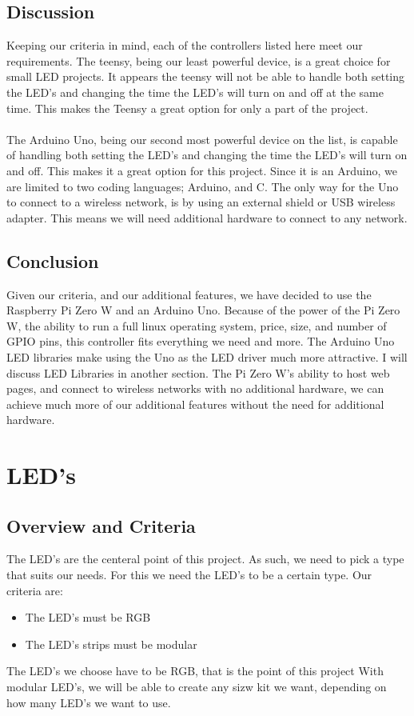 \documentclass[onecolumn, draftclsnofoot,10pt, compsoc]{IEEEtran}
\begin{document}
		\subsection{Discussion}
		Keeping our criteria in mind, each of the controllers listed here meet our
		requirements. The teensy, being our least powerful device, is a great choice
		for small LED projects. It appears the teensy will not be able to handle
		both setting the LED's and changing the time the LED's will turn on and off
		at the same time. This makes the Teensy a great option for only a part of
		the project.
		\\\\
		The Arduino Uno, being our second most powerful device on the list, is
		capable of handling both setting the LED's and changing the time the LED's
		will turn on and off. This makes it a great option for this project. Since
		it is an Arduino, we are limited to two coding languages; Arduino, and C.
		The only way for the Uno to connect to a wireless network, is by using an
		external shield or USB wireless adapter. This means we will need additional
		hardware to connect to any network.
		\subsection{Conclusion}
		Given our criteria, and our additional features, we have decided to use the
		Raspberry Pi Zero W and an Arduino Uno. Because of the power of the Pi Zero
		W, the ability to run a full linux operating system, price, size, and number
		of GPIO pins, this controller fits everything we need and more. The Arduino
		Uno LED libraries make using the Uno as the LED driver much more attractive.
		I will discuss LED Libraries in another section. The Pi Zero W's ability to
		host web pages, and connect to wireless networks with no additional
		hardware, we can achieve much more of our additional features without the
		need for additional hardware.
	\section{LED's}
		\subsection{Overview and Criteria}
		The LED's are the centeral point of this project. As such, we need to pick
		a type that suits our needs. For this we need the LED's to be a certain
		type. Our criteria are:
		\begin{itemize}
			\item The LED's must be RGB
			\item The LED's strips must be modular
		\end{itemize}
		The LED's we choose have to be RGB, that is the point of this project
 		With modular LED's, we will be able to create any sizw kit we want,
		depending on how many LED's we want to use.
\end{document}
